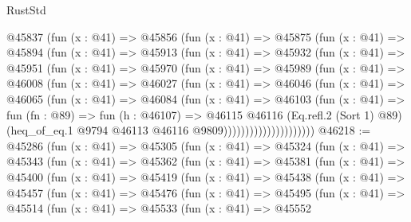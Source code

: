 \begin{lexlean}{RustStd}
\begin{coremodule}
            @45837
              (fun (x : @41) =>
              @45856
                (fun (x : @41) =>
                @45875
                  (fun (x : @41) =>
                  @45894
                    (fun (x : @41) =>
                    @45913
                      (fun (x : @41) =>
                      @45932
                        (fun (x : @41) =>
                        @45951
                          (fun (x : @41) =>
                          @45970
                            (fun (x : @41) =>
                            @45989
                              (fun (x : @41) =>
                              @46008
                                (fun (x : @41) =>
                                @46027
                                  (fun (x : @41) =>
                                  @46046
                                    (fun (x : @41) =>
                                    @46065
                                      (fun (x : @41) =>
                                      @46084
                                        (fun (x : @41) =>
                                        @46103
                                          (fun (x : @41) =>
                                          fun (fn : @89) =>
                                          fun (h : @46107) =>
                                          @46115
                                            @46116
                                            (Eq.refl.{2} (Sort 1) @89)
                                            (heq_of_eq.{1}
                                              @9794
                                              @46113
                                              @46116
                                              @9809)))))))))))))))))))))
@46218 := @45286
    (fun (x : @41) =>
    @45305
      (fun (x : @41) =>
      @45324
        (fun (x : @41) =>
        @45343
          (fun (x : @41) =>
          @45362
            (fun (x : @41) =>
            @45381
              (fun (x : @41) =>
              @45400
                (fun (x : @41) =>
                @45419
                  (fun (x : @41) =>
                  @45438
                    (fun (x : @41) =>
                    @45457
                      (fun (x : @41) =>
                      @45476
                        (fun (x : @41) =>
                        @45495
                          (fun (x : @41) =>
                          @45514
                            (fun (x : @41) =>
                            @45533
                              (fun (x : @41) =>
                              @45552

\end{coremodule}
\end{lexlean}
